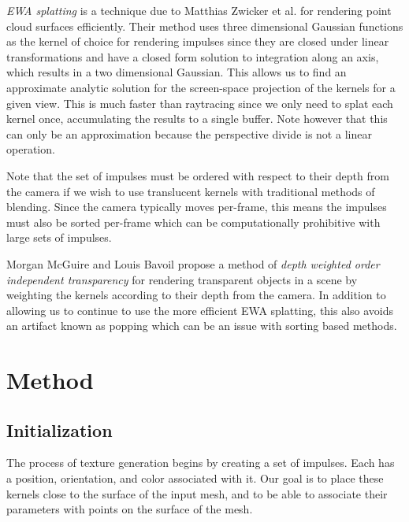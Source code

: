 \documentclass{article}
\begin{document}

\textit{EWA splatting} is a technique due to Matthias Zwicker et al. for rendering point cloud surfaces efficiently.\cite{10.1109/TVCG.2002.1021576} Their method uses three dimensional Gaussian functions as the kernel of choice for rendering impulses since they are closed under linear transformations and have a closed form solution to integration along an axis, which results in a two dimensional Gaussian. This allows us to find an approximate analytic solution for the screen-space projection of the kernels for a given view. This is much faster than raytracing since we only need to splat each kernel once, accumulating the results to a single buffer. Note however that this can only be an approximation because the perspective divide is not a linear operation.

Note that the set of impulses must be ordered with respect to their depth from the camera if we wish to use translucent kernels with traditional methods of blending. Since the camera typically moves per-frame, this means the impulses must also be sorted per-frame which can be computationally prohibitive with large sets of impulses.

Morgan McGuire and Louis Bavoil propose a method of \textit{depth weighted order independent transparency} for rendering transparent objects in a scene by weighting the kernels according to their depth from the camera.\cite{McGuire2013Transparency}
In addition to allowing us to continue to use the more efficient EWA splatting, this also avoids an artifact known as popping which can be an issue with sorting based methods.

\section{Method}

\subsection{Initialization}

The process of texture generation begins by creating a set of impulses. Each has a position, orientation, and color associated with it. Our goal is to place these kernels close to the surface of the input mesh, and to be able to associate their parameters with points on the surface of the mesh.
\end{document}

